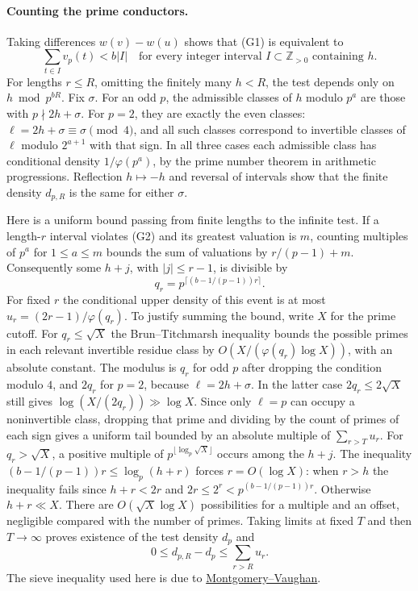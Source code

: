 \paragraph{Counting the prime conductors.}
Taking differences $w(v)-w(u)$ shows that (G1) is equivalent to
\[
        \sum_{t\in I}v_p(t)<b|I|
        \quad\text{for every integer interval }I\subset\mathbb Z_{>0}
        \text{ containing }h.                                \tag{G2}
\]
For lengths $r\le R$, omitting the finitely many $h<R$, the test
depends only on $h\bmod p^{bR}$. Fix $\sigma$. For an odd $p$, the admissible classes of $h$ modulo $p^a$
are those with $p\nmid 2h+\sigma$. For $p=2$, they are exactly the
even classes: $\ell=2h+\sigma\equiv\sigma\pmod4$,
and all such classes correspond to invertible classes of $\ell$
modulo $2^{a+1}$ with that sign. In all three cases each admissible class
has conditional density $1/\varphi(p^a)$, by the prime number theorem
in arithmetic progressions. Reflection $h\mapsto-h$ and reversal of
intervals show that the finite density $d_{p,R}$ is the same for
either $\sigma$.

Here is a uniform bound passing from finite lengths to the infinite
test. If a length-$r$ interval violates (G2) and its greatest
valuation is $m$, counting multiples of $p^a$ for $1\le a\le m$
bounds the sum of valuations by $r/(p-1)+m$. Consequently some
$h+j$, with $|j|\le r-1$, is divisible by
\[
      q_r=p^{\lceil (b-1/(p-1))r\rceil}.
\]
For fixed $r$ the conditional upper density of this event is at most
$u_r=(2r-1)/\varphi(q_r)$. To justify summing the bound, write
$X$ for the prime cutoff. For $q_r\le\sqrt X$ the Brun--Titchmarsh
inequality bounds the possible primes in each relevant invertible residue
class by $O(X/(\varphi(q_r)\log X))$, with an absolute constant.
The modulus is $q_r$ for odd $p$ after dropping the condition modulo
$4$, and $2q_r$ for $p=2$, because $\ell=2h+\sigma$. In the latter
case $2q_r\le 2\sqrt X$ still gives $\log(X/(2q_r))\gg\log X$. Since only $\ell=p$
can occupy a noninvertible class, dropping that prime and dividing
by the count of primes of each sign gives a uniform tail bounded by
an absolute multiple of $\sum_{r>T}u_r$. For $q_r>\sqrt X$, a positive
multiple of $p^{\lfloor\log_p\sqrt X\rfloor}$ occurs among the $h+j$.
The inequality $(b-1/(p-1))r\le\log_p(h+r)$ forces $r=O(\log X)$:
when $r>h$ the inequality fails since $h+r<2r$ and
$2r\le 2^r<p^{(b-1/(p-1))r}$. Otherwise $h+r\ll X$.
There are $O(\sqrt X\log X)$ possibilities for a multiple and an
offset, negligible compared with the number of primes. Taking limits
at fixed $T$ and then $T\to\infty$ proves existence of the test
density $d_p$ and
\[
         0\le d_{p,R}-d_p\le\sum_{r>R}u_r.                  \tag{G3}
\]
The sieve inequality used here is due to
\href{https://doi.org/10.1112/S0025579300004708}{Montgomery--Vaughan}.

